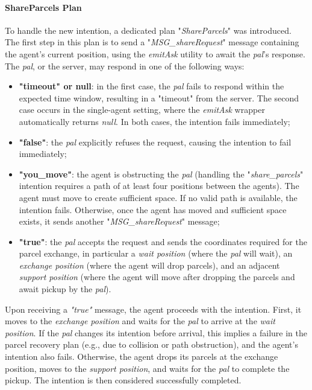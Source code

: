                 \paragraph{ShareParcels Plan}
                    To handle the new intention, a dedicated plan "\textit{ShareParcels}" was introduced. The first step in this plan is to send a "\textit{MSG\_shareRequest}" message containing the agent's current position, using the \textit{emitAsk} utility to await the \textit{pal}'s response. The \textit{pal}, or the server, may respond in one of the following ways:
                    \begin{itemize}
                        \item \textbf{"timeout" or null}: in the first case, the \textit{pal} fails to respond within the expected time window, resulting in a "timeout" from the server. The second case occurs in the single-agent setting, where the \textit{emitAsk} wrapper automatically returns \textit{null}. In both cases, the intention fails immediately;
                        \item \textbf{"false"}: the \textit{pal} explicitly refuses the request, causing the intention to fail immediately;
                        \item \textbf{"you\_move"}: the agent is obstructing the \textit{pal} (handling the "\textit{share\_parcels}" intention requires a path of at least four positions between the agents). The agent must move to create sufficient space. If no valid path is available, the intention fails. Otherwise, once the agent has moved and sufficient space exists, it sends another "\textit{MSG\_shareRequest}" message;
                        \item \textbf{"true"}: the \textit{pal} accepts the request and sends the coordinates required for the parcel exchange, in particular a \textit{wait position} (where the \textit{pal} will wait), an \textit{exchange position} (where the agent will drop parcels), and an adjacent \textit{support position} (where the agent will move after dropping the parcels and await pickup by the \textit{pal}).
                    \end{itemize}                   
                    Upon receiving a \textit{"true"} message, the agent proceeds with the intention. First, it moves to the \textit{exchange position} and waits for the \textit{pal} to arrive at the \textit{wait position}. If the \textit{pal} changes its intention before arrival, this implies a failure in the parcel recovery plan (e.g., due to collision or path obstruction), and the agent's intention also fails. Otherwise, the agent drops its parcels at the exchange position, moves to the \textit{support position}, and waits for the \textit{pal} to complete the pickup. The intention is then considered successfully completed.

